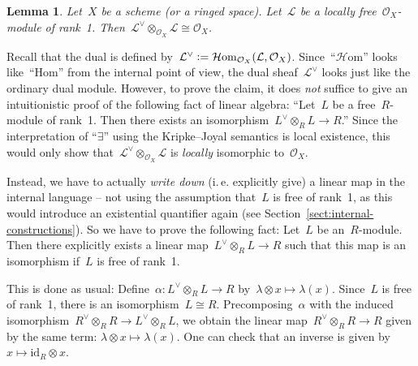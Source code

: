 \documentclass[10pt,reqno,a4paper]{amsbook}
\makeatletter
\theoremstyle{definition}
\theoremstyle{plain}
\newtheorem{lemma}[defn]{Lemma}
\theoremstyle{remark}
\renewcommand{\O}{\mathcal{O}}
\renewcommand{\L}{\mathcal{L}}
\newcommand{\Hom}{\mathrm{Hom}}
\newcommand{\HOM}{\mathcal{H}\mathrm{om}}
\newcommand{\id}{\mathrm{id}}
\newcommand{\?}{\,{:}\,}
\renewcommand{\_}{\mathpunct{.}\,}
\newcommand{\ie}{i.\,e.\@\xspace}
\newcommand{\defeq}{\vcentcolon=}
\renewenvironment{proof}[1][\proofname]{\par
  \pushQED{\qed}%
  \normalfont \topsep6\p@\@plus6\p@\relax
  \trivlist
  \item[\hskip\labelsep
        \itshape
    #1\@addpunct{.}]\ignorespaces
}{%
  \popQED\endtrivlist\@endpefalse
}
\makeatother
\begin{document}
\begin{lemma}Let~$X$ be a scheme (or a ringed space). Let~$\L$ be a locally
free~$\O_X$-module of rank~1. Then~$\L^\vee \otimes_{\O_X} \L \cong \O_X$.\end{lemma}
\begin{proof}Recall that the dual is defined by~$\L^\vee \defeq
\HOM_{\O_X}(\L,\O_X)$. Since~``$\HOM$'' looks like~``$\Hom$'' from the internal
point of view, the dual sheaf~$\L^\vee$ looks just like the ordinary dual
module. However, to prove the claim, it does \emph{not} suffice to give an
intuitionistic proof of the following fact of linear algebra: ``Let~$L$ be a
free~$R$-module of rank~1. Then there exists an isomorphism~$L^\vee \otimes_R L
\to R$.'' Since the interpretation of ``$\exists$'' using the Kripke--Joyal
semantics is local existence, this would only show that~$\L^\vee \otimes_{\O_X}
\L$ is \emph{locally} isomorphic to~$\O_X$.

Instead, we have to actually \emph{write down} (\ie explicitly give) a
linear map in the internal language -- not using the assumption that~$L$ is
free of rank~1, as this would introduce an existential quantifier again (see
Section~\ref{sect:internal-constructions}).
So we have to prove the following fact: Let~$L$ be an~$R$-module. Then there
explicitly exists a linear map~$L^\vee \otimes_R L \to R$ such that this map is
an isomorphism if~$L$ is free of rank~1.

This is done as usual: Define~$\alpha : L^\vee \otimes_R L \to R$ by~$\lambda
\otimes x \mapsto \lambda(x)$. Since~$L$ is free of rank~1, there is an
isomorphism~$L \cong R$. Precomposing~$\alpha$
with the induced isomorphism~$R^\vee \otimes_R R \to L^\vee \otimes_R L$,
we obtain the linear map~$R^\vee \otimes_R R \to R$ given by the same
term: $\lambda \otimes x \mapsto \lambda(x)$. One can check that an inverse is given
by~$x \mapsto \id_R \otimes x$.
\end{proof}
\end{document}
